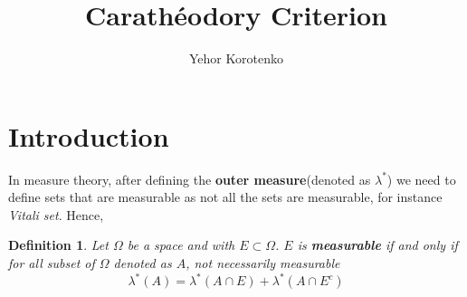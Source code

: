 \documentclass[a4paper]{article}
\author{Yehor Korotenko}
\title{Carathéodory Criterion}
\newtheorem{definition}{Definition}[section]
\begin{document}
\maketitle
\section{Introduction}
   In measure theory, after defining the \textbf{outer measure}(denoted as $\lambda^*$) we need to
   define sets that are measurable as not all the sets are measurable, for
   instance \textit{Vitali set}. Hence,
\begin{definition}
Let $\Omega$ be a space and with $E \subset \Omega$. $E$ is  \textbf{measurable} if and only if for all subset of $\Omega$ denoted as $A$, not necessarily measurable
\[
\lambda^*(A) = \lambda^*(A \cap E) + \lambda^*(A \cap E^c)
\] 
\end{definition}
\end{document}
